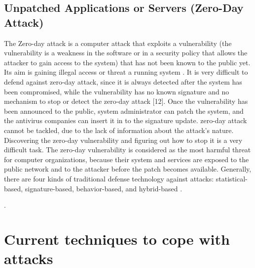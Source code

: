 \documentclass[twocolumn]{article}
\begin{document}
\subsection{Unpatched Applications or Servers (Zero-Day Attack)}

The Zero-day attack is a computer attack that exploits a vulnerability (the vulnerability is a weakness in the software or in a security policy that allows the attacker to gain access to the system) that has not been known to the public yet. Its aim is gaining illegal access or threat a running system . It is very difficult to defend against zero-day attack, since it is always detected after the system has been compromised, while the vulnerability has no known signature and no mechanism to stop or detect the zero-day attack [12]. Once the vulnerability has been announced to the public, system administrator can patch the system, and the antivirus companies can insert it in to the signature update.
zero-day attack cannot be tackled, due to the lack of information about the attack’s nature. Discovering the zero-day vulnerability and figuring out how to stop it is a very difficult task. The zero-day vulnerability is considered as the most harmful threat for computer organizations, because their system and services are exposed to the public network and to the attacker before the patch becomes available. Generally, there are four kinds of traditional defense technology against attacks: statistical-based, signature-based, behavior-based, and hybrid-based .

\cite{al2019zero}.

\section{Current techniques to cope with attacks}

\textcolor{red}{\lipsum[1]}

\end{document}
